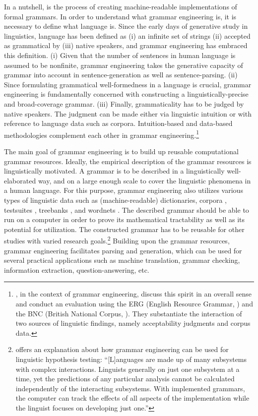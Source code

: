 In a nutshell,  is the process of creating
machine-readable implementations of formal grammars. In order to
understand what grammar engineering is, it is necessary to define what
language is.  Since the early days of generative study in linguistics,
language has been defined as (i) an infinite set of strings
(ii) accepted as grammatical by (iii) native speakers, and grammar
engineering has embraced this definition.  (i) Given that the number
of sentences in human language is assumed to be nonfinite, grammar
engineering takes the generative capacity of grammar into account in
sentence-generation as well as sentence-parsing. (ii) Since formulating
grammatical well-formedness in a language is crucial, grammar engineering is
fundamentally concerned with constructing a linguistically-precise and
broad-coverage grammar. (iii) Finally, grammaticality has to be judged
by native speakers. The judgment can be made either via linguistic
intuition or with reference to language data such as corpora.
Intuition-based and data-based methodologies complement each other in
grammar engineering.\footnote{\citet{balwin:etal:05}, in the context
  of grammar engineering, discuss this spirit in an overall sense and
  conduct an evaluation using the ERG (English Resource Grammar,
  \citealt{flickinger:00}) and the BNC (British National Corpus,
  \citealt{burnard:00}). They substantiate the interaction of two
  sources of linguistic findings, namely acceptability judgments and
  corpus data.}
\newpage



The main goal of grammar engineering is to build up reusable
computational grammar resources. Ideally, the
empirical description of the grammar resources is linguistically
motivated. A grammar is to be described in a linguistically
well-elaborated way, and on a large enough scale to cover the
linguistic phenomena in a human language.  For this purpose, grammar
engineering also utilizes various types of linguistic data such as
(machine-readable) dictionaries, corpora
\citep{nichols:etal:10,song:etal:10}, testsuites \citep{oepen:01},
treebanks \citep{oepen:etal:04,bond:etal:06}, and wordnets
\citep{bond:etal:09,pozen:13}.  The described grammar should be able
to run on a computer in order to prove its mathematical tractability
as well as its potential for utilization. The constructed grammar has
to be reusable for other studies with varied research
goals.\footnote{\citet[16]{bender:08} offers an explanation about how
  grammar engineering can be used for linguistic hypothesis testing:
  ``[L]anguages are made up of many subsystems with complex
  interactions. Linguists generally  on just one subsystem
  at a time, yet the predictions of any particular analysis cannot be
  calculated independently of the interacting subsystems. With
  implemented grammars, the computer can track the effects of all
  aspects of the implementation while the linguist focuses on
  developing just one.''} Building upon the grammar resources, grammar
engineering facilitates parsing and generation, which can be used for
several practical applications such as machine translation, grammar
checking, information extraction, question-answering, etc.




